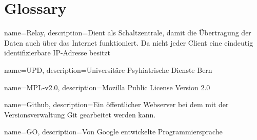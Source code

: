 \chapter{Glossary}

{
    name=Relay,
    description={Dient als Schaltzentrale, damit die Übertragung der Daten auch über das Internet funktioniert. Da nicht jeder Client eine eindeutig identifizierbare IP-Adresse besitzt}
}

{
    name=UPD,
    description={Universitäre Psyhiatrische Dienste Bern}
}

{
    name=MPL-v2.0,
    description={Mozilla Public License Version 2.0}
}

{
    name=Github,
    description={Ein öffentlicher Webserver bei dem mit der Versionsverwaltung Git gearbeitet werden kann.}
}

{
    name=GO,
    description={Von Google entwickelte Programmiersprache}
}

\printglossaries
